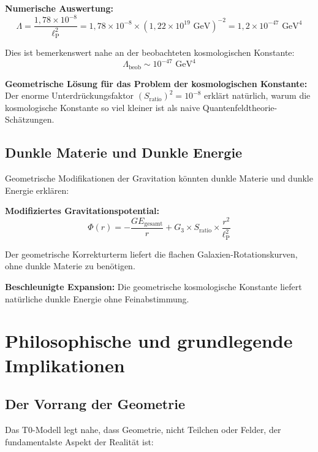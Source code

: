 \documentclass[12pt,a4paper]{report}
\newcommand{\lP}{\ell_{\text{P}}}         %
\begin{document}
	\textbf{Numerische Auswertung:}
	\begin{equation}
		\Lambda = \frac{1,78 \times 10^{-8}}{\lP^2} = 1,78 \times 10^{-8} \times (1,22 \times 10^{19} \text{ GeV})^{-2} = 1,2 \times 10^{-47} \text{ GeV}^4
	\end{equation}
	
	Dies ist bemerkenswert nahe an der beobachteten kosmologischen Konstante:
	\begin{equation}
		\Lambda_{\text{beob}} \sim 10^{-47} \text{ GeV}^4
	\end{equation}
	
	\textbf{Geometrische Lösung für das Problem der kosmologischen Konstante:}
	Der enorme Unterdrückungsfaktor $(S_{\text{ratio}})^2 = 10^{-8}$ erklärt natürlich, warum die kosmologische Konstante so viel kleiner ist als naive Quantenfeldtheorie-Schätzungen.
	
	\subsection{Dunkle Materie und Dunkle Energie}
	\label{subsec:dark_matter_energy}
	
	Geometrische Modifikationen der Gravitation könnten dunkle Materie und dunkle Energie erklären:
	
	\textbf{Modifiziertes Gravitationspotential:}
	\begin{equation}
		\Phi(r) = -\frac{GE_{\text{gesamt}}}{r} + G_3 \times S_{\text{ratio}} \times \frac{r^2}{\lP^2}
	\end{equation}
	
	Der geometrische Korrekturterm liefert die flachen Galaxien-Rotationskurven, ohne dunkle Materie zu benötigen.
	
	\textbf{Beschleunigte Expansion:}
	Die geometrische kosmologische Konstante liefert natürliche dunkle Energie ohne Feinabstimmung.
	
	\section{Philosophische und grundlegende Implikationen}
	\label{sec:philosophical_implications}
	
	\subsection{Der Vorrang der Geometrie}
	\label{subsec:primacy_geometry}
	
	Das T0-Modell legt nahe, dass Geometrie, nicht Teilchen oder Felder, der fundamentalste Aspekt der Realität ist:
	
\end{document}
